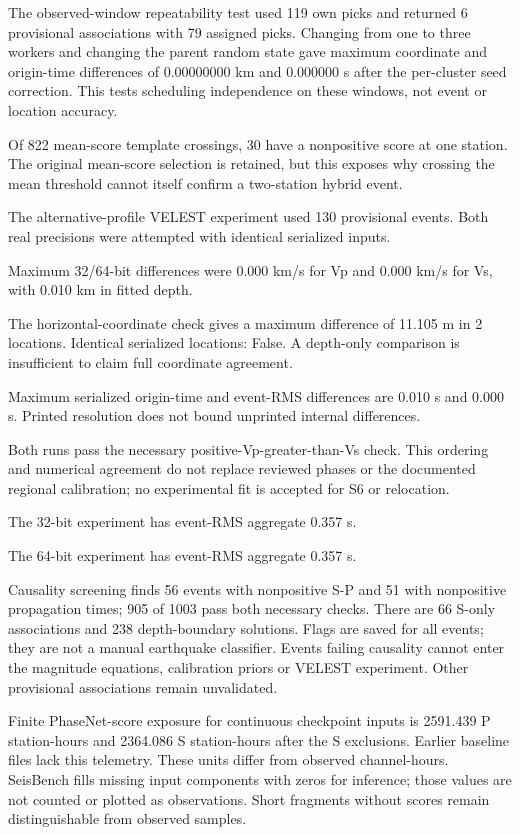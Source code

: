 The observed-window repeatability test used 119 own picks and returned 6 provisional associations with 79 assigned picks. Changing from one to three workers and changing the parent random state gave maximum coordinate and origin-time differences of 0.00000000 km and 0.000000 s after the per-cluster seed correction. This tests scheduling independence on these windows, not event or location accuracy.

Of 822 mean-score template crossings, 30 have a nonpositive score at one station. The original mean-score selection is retained, but this exposes why crossing the mean threshold cannot itself confirm a two-station hybrid event.

The alternative-profile VELEST experiment used 130 provisional events. Both real precisions were attempted with identical serialized inputs.

Maximum 32/64-bit differences were 0.000 km/s for Vp and 0.000 km/s for Vs, with 0.010 km in fitted depth.

The horizontal-coordinate check gives a maximum difference of 11.105 m in 2 locations. Identical serialized locations: False. A depth-only comparison is insufficient to claim full coordinate agreement.

Maximum serialized origin-time and event-RMS differences are 0.010 s and 0.000 s. Printed resolution does not bound unprinted internal differences.

Both runs pass the necessary positive-Vp-greater-than-Vs check. This ordering and numerical agreement do not replace reviewed phases or the documented regional calibration; no experimental fit is accepted for S6 or relocation.

The 32-bit experiment has event-RMS aggregate 0.357 s.

The 64-bit experiment has event-RMS aggregate 0.357 s.

Causality screening finds 56 events with nonpositive S-P and 51 with nonpositive propagation times; 905 of 1003 pass both necessary checks. There are 66 S-only associations and 238 depth-boundary solutions. Flags are saved for all events; they are not a manual earthquake classifier. Events failing causality cannot enter the magnitude equations, calibration priors or VELEST experiment. Other provisional associations remain unvalidated.

Finite PhaseNet-score exposure for continuous checkpoint inputs is 2591.439 P station-hours and 2364.086 S station-hours after the S exclusions. Earlier baseline files lack this telemetry. These units differ from observed channel-hours. SeisBench fills missing input components with zeros for inference; those values are not counted or plotted as observations. Short fragments without scores remain distinguishable from observed samples.

